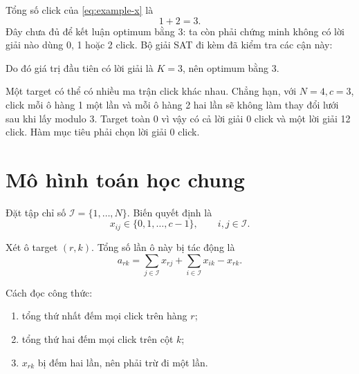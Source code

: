 \documentclass[11pt,a4paper]{article}
\newcommand{\I}{\mathcal{I}}
\begin{document}
Tổng số click của \cref{eq:example-x} là
\[
  1+2=3.
\]
Đây chưa đủ để kết luận optimum bằng 3: ta còn phải chứng minh không có lời
giải nào dùng 0, 1 hoặc 2 click. Bộ giải SAT đi kèm đã kiểm tra các cận này:

\begin{center}
\end{center}

Do đó giá trị đầu tiên có lời giải là $K=3$, nên optimum bằng 3.

\begin{notebox}
Một target có thể có nhiều ma trận click khác nhau. Chẳng hạn, với
$N=4,c=3$, click mỗi ô hàng 1 một lần và mỗi ô hàng 2 hai lần sẽ không làm
thay đổi lưới sau khi lấy modulo 3. Target toàn 0 vì vậy có cả lời giải
0 click và một lời giải 12 click. Hàm mục tiêu phải chọn lời giải 0 click.
\end{notebox}

\section{Mô hình toán học chung}\label{sec:math}

Đặt tập chỉ số $\I=\{1,\ldots,N\}$. Biến quyết định là
\[
  x_{ij}\in\{0,1,\ldots,c-1\},
  \qquad i,j\in\I.
\]

Xét ô target $(r,k)$. Tổng số lần ô này bị tác động là
\begin{equation}\label{eq:raw-effect}
  a_{rk}
  =
  \sum_{j\in\I}x_{rj}
  +
  \sum_{i\in\I}x_{ik}
  -
  x_{rk}.
\end{equation}

Cách đọc công thức:
\begin{enumerate}
  \item tổng thứ nhất đếm mọi click trên hàng $r$;
  \item tổng thứ hai đếm mọi click trên cột $k$;
  \item $x_{rk}$ bị đếm hai lần, nên phải trừ đi một lần.
\end{enumerate}
\end{document}
